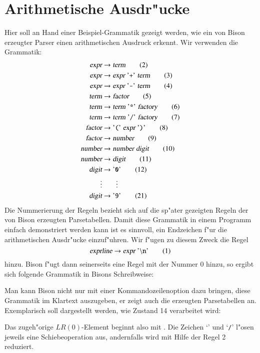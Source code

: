 \section{Arithmetische Ausdr"ucke}
Hier soll an Hand einer Beispiel-Grammatik gezeigt werden, wie ein 
von Bison erzeugter Parser einen arithmetischen Ausdruck
erkennt. Wir verwenden die Grammatik:
\begin{align}
\textsl{expr}&\rightarrow \textsl{term}\tag{2}\\
\textsl{expr}&\rightarrow \textsl{expr}\;\text{'{\tt +}'}\;\textsl{term}\tag{3}\\
\textsl{expr}&\rightarrow \textsl{expr}\;\text{'{\tt -}'}\;\textsl{term}\tag{4}\\
\textsl{term}&\rightarrow \textsl{factor}\tag{5}\\
\textsl{term}&\rightarrow \textsl{term}\;\text{'{\tt *}'}\;\textsl{factory}\tag{6}\\
\textsl{term}&\rightarrow \textsl{term}\;\text{'{\tt /}'}\;\textsl{factory}\tag{7}\\
\textsl{factor}&\rightarrow\text{'{\tt (}'}\;\textsl{expr}\;\text{'{\tt )}'}\tag{8}\\
\textsl{factor}&\rightarrow\textsl{number}\tag{9}\\
\textsl{number}&\rightarrow\textsl{number}\;\textsl{digit}\tag{10}\\
\textsl{number}&\rightarrow\textsl{digit}\tag{11}\\
\textsl{digit}&\rightarrow\text{'{\tt 0}'}\tag{12}\\
\vdots&\qquad\vdots\notag\\
\textsl{digit}&\rightarrow\text{'{\tt 9}'}\tag{21}
\end{align}
Die Nummerierung der Regeln bezieht sich auf die sp"ater gezeigten Regeln
der von Bison erzeugten Parsetabellen. Damit diese Grammatik in einem
Programm einfach demonstriert werden kann ist es sinnvoll, ein Endzeichen
f"ur die arithmetischen Ausdr"ucke einzuf"uhren. Wir f"ugen zu diesem
Zweck die Regel 
\begin{equation}
\textsl{exprline}\rightarrow \textsl{expr}\;\text{'{\tt $\setminus$n}'}
\tag{1}
\end{equation}
hinzu. Bison f"ugt dann seinerseits eine Regel mit der Nummer 0 hinzu, so ergibt
sich folgende Grammatik in Bisons Schreibweise:

Man kann Bison nicht nur mit einer Kommandozeilenoption dazu bringen, diese
Grammatik im Klartext auszugeben, er zeigt auch die erzeugten Parsetabellen
an. Exemplarisch soll dargestellt werden, wie Zustand 14 verarbeitet
wird:

Das zugeh"orige $LR(0)$-Element beginnt also mit . Die Zeichen
`{\tt *}' und `{\tt /}' l"osen jeweils eine Schiebeoperation aus, andernfalls
wird mit Hilfe der Regel 2 reduziert.

